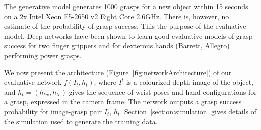 The generative model generates 1000 grasps for a new object within 15 seconds on a 2x Intel Xeon E5-2650 v2 Eight Core 2.6GHz. There is, however, no estimate of the probability of grasp success. This the purpose of the evaluative model. Deep networks have been shown to learn good evaluative models of grasp success for two finger grippers and for dexterous hands (Barrett, Allegro) performing power grasps.  

We now present the architecture (Figure~\ref{fig:networkArchitecture}) of our evaluative network $f(I_t, h_t)$, where $I^t$ is a colourized depth image of the object, and $h_t = (h_{tw}, h_{tc})$ gives the sequence of wrist poses and hand configurations for a grasp, expressed in the camera frame. The network outputs a grasp success probability for image-grasp pair $I_t$, $h_t$. Section~\ref{section:simulation} gives details of the simulation used to generate the training data.

